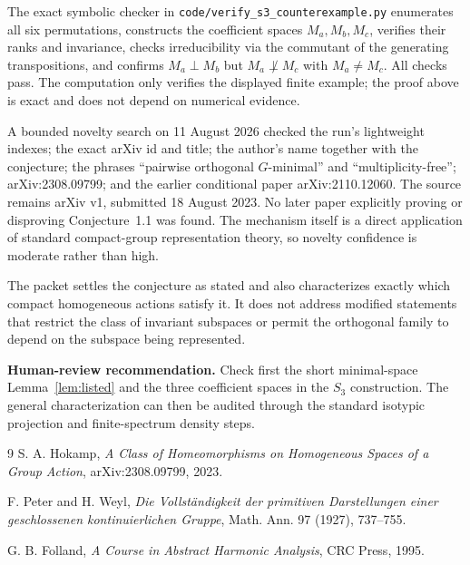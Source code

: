 \documentclass[11pt]{article}
\begin{document}
The exact symbolic checker in \texttt{code/verify\_s3\_counterexample.py}
enumerates all six permutations, constructs the coefficient spaces
$M_a,M_b,M_c$, verifies their ranks and invariance, checks irreducibility via
the commutant of the generating transpositions, and confirms
$M_a\perp M_b$ but $M_a\not\perp M_c$ with $M_a\neq M_c$.  All checks pass.
The computation only verifies the displayed finite example; the proof above
is exact and does not depend on numerical evidence.

A bounded novelty search on 11 August 2026 checked the run's lightweight
indexes; the exact arXiv id and title; the author's name together with the
conjecture; the phrases ``pairwise orthogonal $G$-minimal'' and
``multiplicity-free''; arXiv:2308.09799; and the earlier conditional paper
arXiv:2110.12060.  The source remains arXiv v1, submitted 18 August 2023.
No later paper explicitly proving or disproving Conjecture~1.1 was found.
The mechanism itself is a direct application of standard compact-group
representation theory, so novelty confidence is moderate rather than high.

The packet settles the conjecture as stated and also characterizes exactly
which compact homogeneous actions satisfy it.  It does not address modified
statements that restrict the class of invariant subspaces or permit the
orthogonal family to depend on the subspace being represented.

\textbf{Human-review recommendation.}  Check first the short
minimal-space Lemma~\ref{lem:listed} and the three coefficient spaces in the
$S_3$ construction.  The general characterization can then be audited through
the standard isotypic projection and finite-spectrum density steps.

\begin{thebibliography}{9}
S. A. Hokamp,
\emph{A Class of Homeomorphisms on Homogeneous Spaces of a Group Action},
arXiv:2308.09799, 2023.

F. Peter and H. Weyl,
\emph{Die Vollst\"andigkeit der primitiven Darstellungen einer geschlossenen
kontinuierlichen Gruppe},
Math. Ann. 97 (1927), 737--755.

G. B. Folland,
\emph{A Course in Abstract Harmonic Analysis},
CRC Press, 1995.
\end{thebibliography}
\end{document}
